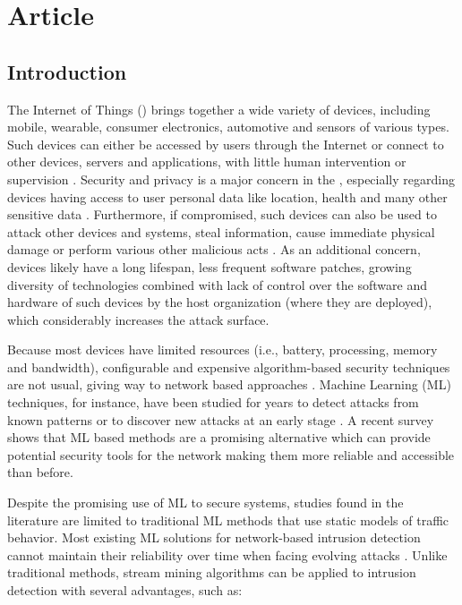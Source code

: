 \section{Article}

\subsection{Introduction}

The Internet of Things (\iot) brings together a wide variety of devices,
including mobile, wearable, consumer electronics, automotive and sensors of
various types.
% 
Such devices can either be accessed by users through the Internet or connect
to other devices, servers and applications,
with little human intervention or supervision
\cite{Tahsien2020,abane2019,haddadpajouh2019survey,Shanbhag2015}.
% 
Security and privacy is a major concern in the \iot, especially regarding
devices having access to user personal data like
location, health and many other sensitive data \cite{sengupta2020comprehensive}.
% 
Furthermore, if compromised, such devices can also be used to attack other
devices and systems, steal information, cause immediate physical damage or
perform various other malicious acts \cite{Kolias2017mirai}.
% 
As an additional concern, \iot devices likely have a long lifespan, less frequent
software patches, growing diversity of technologies combined with lack of
control over the software and hardware of such devices by the host organization
(where they are deployed), which considerably increases the attack surface.

Because most \iot devices have limited resources (i.e., battery, processing,
memory and bandwidth), configurable and expensive algorithm-based
security techniques are not usual, giving way to network based approaches 
\cite{Zhou2017}.
Machine Learning (ML) techniques, for instance, have been studied for years to detect attacks
from known patterns or to discover new attacks at an early stage
\cite{buczak2016survey,mitchell2014survey}.
A recent survey \cite{Tahsien2020} shows that ML based methods are a
promising alternative which can provide potential security tools for the \iot
network making them more reliable and accessible than before.

Despite the promising use of ML to secure \iot systems, studies found in the
literature \cite{buczak2016survey,mitchell2014survey,Tahsien2020} are limited to
traditional ML methods that use static models of traffic behavior.
Most existing ML solutions for network-based intrusion detection cannot maintain
their reliability over time when facing evolving attacks \cite{Viegas2019,AndreoniLopez2019}.
Unlike traditional methods, stream mining algorithms can be applied to intrusion
detection with several advantages, such as:

